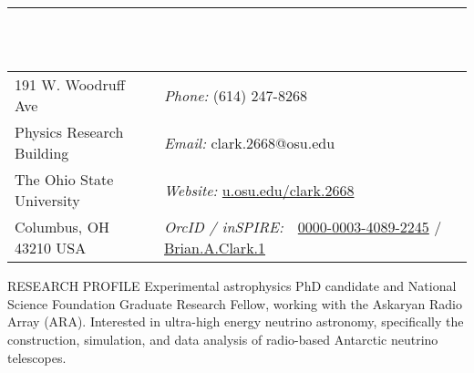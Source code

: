 \documentclass{resume} %
\begin{document}

\vspace{-1cm}
\rule{\textwidth}{0.1cm} \\ \\
\begin{tabular}{@{}p{2in}p{4in}}
191 W. Woodruff Ave             & {\it Phone:}  (614) 247-8268 \\            
Physics Research Building   & {\it Email:}  clark.2668@osu.edu 
 \\         
The Ohio State University & {\it Website:} \url{u.osu.edu/clark.2668} \\       
Columbus, OH  43210 USA  & {\it OrcID / inSPIRE:} \,\,      \href{https://orcid.org/0000-0003-4089-2245}{0000-0003-4089-2245}  / \href{https://inspirehep.net/author/profile/Brian.A.Clark.1}{Brian.A.Clark.1}\\     
\end{tabular}


\begin{rSection}{RESEARCH PROFILE}
Experimental astrophysics PhD candidate and National Science Foundation Graduate Research Fellow, working with the Askaryan Radio Array (ARA). Interested in ultra-high energy neutrino astronomy, specifically the construction, simulation, and data analysis of radio-based Antarctic neutrino telescopes.
\end{rSection}
\end{document}
